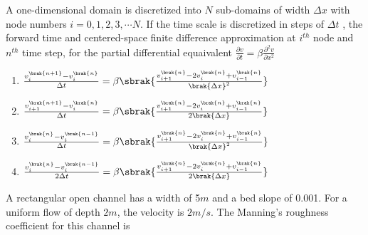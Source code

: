 \iffalse
\title{2019-CE-27-39}
\author{EE24BTECH11001 -  ADITYA TRIPATHY}
\section{ce}
\chapter{2019}
\fi
    \item 
        A one-dimensional domain is discretized into $N$ sub-domains of width $\Delta x$ with node
        numbers $i = 0, 1, 2, 3, \cdots N$. If the time scale is discretized in steps of $\Delta t$
        , the forward time and centered-space finite difference approximation at $i^{th}$ node and
        $n^{th}$ time step, for the partial differential equaivalent 
        $\frac{\partial v}{\partial t} = \beta \frac{\partial ^2 v}{\partial x^2}$
        
        \hfill{}
        \begin{enumerate}
                \item $\frac{v_i ^{\brak{n+1}} - v_i ^{\brak{n}}}{\Delta t} = \beta \sbrak{\frac{v_{i+1}^{\brak{n}} - 2v_i ^{\brak{n}} + v_{i-1}^{\brak{n}}}{\brak{\Delta x}^2}}$
                \item $\frac{v_{i+1} ^{\brak{n+1}} - v_i ^{\brak{n}}}{\Delta t} = \beta \sbrak{\frac{v_{i+1}^{\brak{n}} - 2v_i ^{\brak{n}} + v_{i-1}^{\brak{n}}}{2\brak{\Delta x}}}$
                \item $\frac{v_i ^{\brak{n}} - v_i ^{\brak{n-1}}}{\Delta t} = \beta \sbrak{\frac{v_{i+1}^{\brak{n}} - 2v_i ^{\brak{n}} + v_{i-1}^{\brak{n}}}{\brak{\Delta x}^2}}$
                \item $\frac{v_i ^{\brak{n}} - v_i ^{\brak{n-1}}}{2\Delta t} = \beta \sbrak{\frac{v_{i+1}^{\brak{n}} - 2v_i ^{\brak{n}} + v_{i-1}^{\brak{n}}}{2\brak{\Delta x}}}$
            \end{enumerate}
    \item A rectangular open channel has a width of 5$m$ and a bed slope of 0.001. For a uniform
        flow of depth $2m$, the velocity is $2m/s$. The Manning's roughness coefficient for this channel
        is

